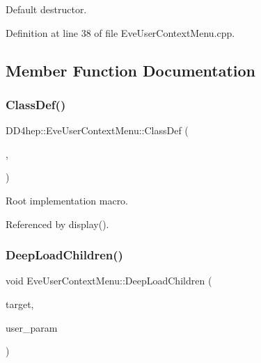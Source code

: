 Default destructor. 



Definition at line 38 of file Eve\+User\+Context\+Menu.\+cpp.



\subsection{Member Function Documentation}
\hypertarget{class_d_d4hep_1_1_eve_user_context_menu_a05246cb30938d2a51dbb68468a3e8f8f}{}\label{class_d_d4hep_1_1_eve_user_context_menu_a05246cb30938d2a51dbb68468a3e8f8f} 
\subsubsection{\texorpdfstring{Class\+Def()}{ClassDef()}}
{\footnotesize\ttfamily D\+D4hep\+::\+Eve\+User\+Context\+Menu\+::\+Class\+Def (\begin{DoxyParamCaption}\item[{\hyperlink{class_d_d4hep_1_1_eve_user_context_menu}{Eve\+User\+Context\+Menu}}]{,  }\item[{0}]{ }\end{DoxyParamCaption})}



Root implementation macro. 



Referenced by display().

\hypertarget{class_d_d4hep_1_1_eve_user_context_menu_a10d91b40facd41a45d562d9667767884}{}\label{class_d_d4hep_1_1_eve_user_context_menu_a10d91b40facd41a45d562d9667767884} 
\subsubsection{\texorpdfstring{Deep\+Load\+Children()}{DeepLoadChildren()}}
{\footnotesize\ttfamily void Eve\+User\+Context\+Menu\+::\+Deep\+Load\+Children (\begin{DoxyParamCaption}\item[{\hyperlink{class_t_object}{T\+Object} $\ast$}]{target,  }\item[{void $\ast$}]{user\+\_\+param }\end{DoxyParamCaption})}



